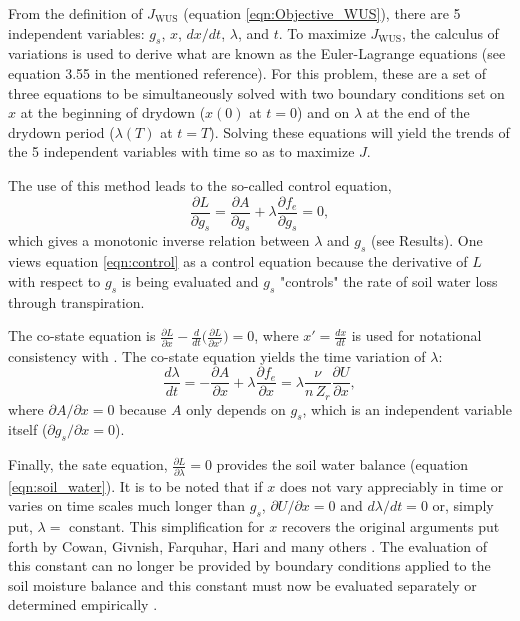 \documentclass[utf8]{frontiersSCNS} %
\begin{document}
From the definition of $J_{\text{WUS}}$ (equation \ref{eqn:Objective_WUS}), there are 5 independent variables: $g_s$, $x$, $dx / dt$, $\lambda$, and $t$. To maximize $J_{\text{WUS}}$, the calculus of variations \citep{witelski_variational_2015} is used to derive what are known as the Euler-Lagrange equations (see equation 3.55 in the mentioned reference). For this problem, these are a set of three equations to be simultaneously solved with two boundary conditions set on $x$ at the beginning of drydown ($x(0)$ at $t=0$) and on $\lambda$ at the end of the drydown period ($\lambda(T)$ at $t=T$). Solving these equations will yield the trends of the 5 independent variables with time so as to maximize $J$.

The use of this method leads to the so-called control equation,
\begin{equation}
    \label{eqn:control}
    \frac{\partial L}{\partial g_s} = \frac{\partial A}{\partial g_s} + \lambda \frac{\partial f_e}{\partial g_s} = 0,
\end{equation}
which gives a monotonic inverse relation between $\lambda$ and $g_s$ (see Results). One views equation \ref{eqn:control} as a control equation because the derivative of $L$ with respect to $g_s$ is being evaluated and $g_s$ "controls" the rate of soil water loss through transpiration. 

The co-state equation is $\frac{\partial L}{\partial x} - \frac{d}{dt} \Big(\frac{\partial L}{\partial x'} \Big) = 0$, where $x'= \frac{dx}{dt}$ is used for notational consistency with \citet{witelski_variational_2015}. The co-state equation yields the time variation of $\lambda$:
\begin{equation}
    \label{eqn:co_state}
    \frac{d \lambda}{dt} = - \frac{\partial A}{\partial x} + \lambda \frac{\partial f_e}{\partial x} = \lambda \frac{\nu}{n\, Z_r} \frac{\partial U}{\partial x},
\end{equation}
where $\partial A / \partial x = 0$ because $A$ only depends on $g_s$, which is an independent variable itself ($\partial g_s / \partial x = 0$).

Finally, the sate equation, $\frac{\partial L}{\partial \lambda} = 0$ provides the soil water balance (equation \ref{eqn:soil_water}). It is to be noted that if $x$ does not vary appreciably in time or varies on time scales much longer than $g_s$, $\partial U/{\partial x} = 0$ and $d\lambda/dt=0$ or, simply put, $\lambda =$ constant.  This simplification for $x$ recovers the original arguments put forth by Cowan, Givnish, Farquhar, Hari and many others \citep{cowan_stomatal_1977,hari1986optimal,konrad2008modelling,katul_stomatal_2009,medlyn2011reconciling}.  The evaluation of this constant can no longer be provided by boundary conditions applied to the soil moisture balance and this constant must now be evaluated separately or determined empirically \citep{manzoni_optimization_2013}.  
\end{document}

